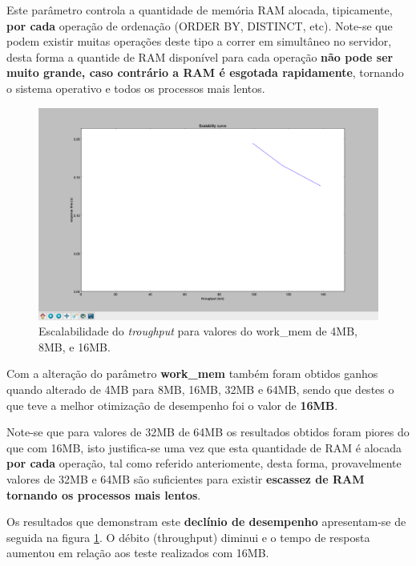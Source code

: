 \hspace{5mm}  Este parâmetro controla a quantidade de memória RAM alocada, tipicamente, \textbf{por cada} operação de ordenação (ORDER BY, DISTINCT, etc). Note-se que podem existir muitas operações deste tipo a correr em simultâneo no servidor, desta forma a quantide de RAM disponível para cada operação \textbf{não pode ser muito grande, caso contrário a RAM é esgotada rapidamente}, tornando o sistema operativo e todos os processos mais lentos.
\begin{figure}[H]
    \centering
    \includegraphics[scale=0.3]{imagens/work-mem-4MB-8MB-16MB.png}
    \caption{Escalabilidade do \emph{troughput} para valores do work\_mem de 4MB, 8MB, e 16MB.}
    \label{fig:exemplo}
\end{figure}

\hspace{5mm} Com a alteração do parâmetro \textbf{work\_mem} também foram obtidos ganhos quando alterado de 4MB para 8MB, 16MB, 32MB e 64MB, sendo que destes o que teve a melhor otimização de desempenho foi o valor de \textbf{16MB}.

\hspace{5mm} Note-se que para valores de 32MB de 64MB os resultados obtidos foram piores do que com 16MB, isto justifica-se uma vez que esta quantidade de RAM é alocada \textbf{por cada} operação, tal como referido anteriomente, desta forma, provavelmente valores de 32MB e 64MB são suficientes para existir \textbf{escassez de RAM tornando os processos mais lentos}. 

\newpage

\hspace{5mm} Os resultados que demonstram este \textbf{declínio de desempenho} apresentam-se de seguida na figura \ref{fig:exemplo}. O débito (throughput) diminui e o tempo de resposta aumentou em relação aos teste realizados com 16MB.

